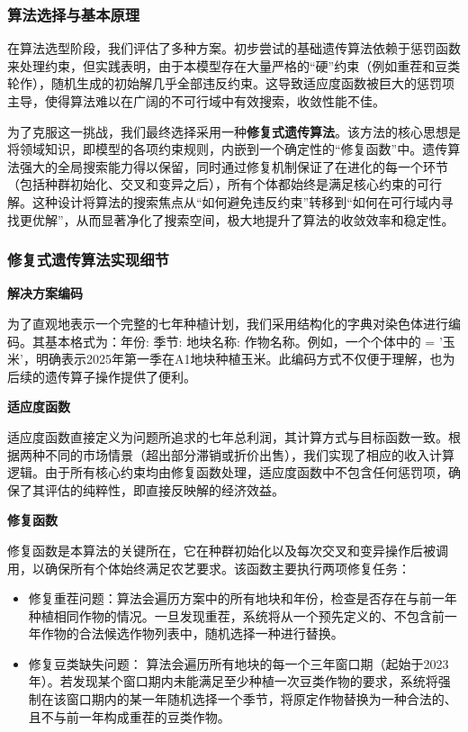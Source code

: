 \subsubsection{算法选择与基本原理}

在算法选型阶段，我们评估了多种方案。初步尝试的基础遗传算法依赖于惩罚函数来处理约束，但实践表明，由于本模型存在大量严格的“硬”约束（例如重茬和豆类轮作），随机生成的初始解几乎全部违反约束。这导致适应度函数被巨大的惩罚项主导，使得算法难以在广阔的不可行域中有效搜索，收敛性能不佳。

为了克服这一挑战，我们最终选择采用一种\textbf{修复式遗传算法}。该方法的核心思想是将领域知识，即模型的各项约束规则，内嵌到一个确定性的“修复函数”中。遗传算法强大的全局搜索能力得以保留，同时通过修复机制保证了在进化的每一个环节（包括种群初始化、交叉和变异之后），所有个体都始终是满足核心约束的可行解。这种设计将算法的搜索焦点从“如何避免违反约束”转移到“如何在可行域内寻找更优解”，从而显著净化了搜索空间，极大地提升了算法的收敛效率和稳定性。

\vspace{1cm}

\subsubsection{修复式遗传算法实现细节}

\textbf{解决方案编码}

为了直观地表示一个完整的七年种植计划，我们采用结构化的字典对染色体进行编码。其基本格式为：{年份: {季节: {地块名称: 作物名称}}}。例如，一个个体中的 = '玉米'，明确表示2025年第一季在A1地块种植玉米。此编码方式不仅便于理解，也为后续的遗传算子操作提供了便利。

\textbf{适应度函数}

适应度函数直接定义为问题所追求的七年总利润，其计算方式与目标函数一致。根据两种不同的市场情景（超出部分滞销或折价出售），我们实现了相应的收入计算逻辑。由于所有核心约束均由修复函数处理，适应度函数中不包含任何惩罚项，确保了其评估的纯粹性，即直接反映解的经济效益。

\textbf{修复函数}

修复函数是本算法的关键所在，它在种群初始化以及每次交叉和变异操作后被调用，以确保所有个体始终满足农艺要求。该函数主要执行两项修复任务：
\begin{itemize}
	\item 修复重茬问题：算法会遍历方案中的所有地块和年份，检查是否存在与前一年种植相同作物的情况。一旦发现重茬，系统将从一个预先定义的、不包含前一年作物的合法候选作物列表中，随机选择一种进行替换。
	\item 修复豆类缺失问题： 算法会遍历所有地块的每一个三年窗口期（起始于2023年）。若发现某个窗口期内未能满足至少种植一次豆类作物的要求，系统将强制在该窗口期内的某一年随机选择一个季节，将原定作物替换为一种合法的、且不与前一年构成重茬的豆类作物。
\end{itemize}

